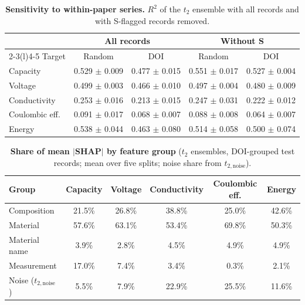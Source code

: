 \documentclass[3p]{elsarticle}
\begin{document}
\clearpage
\begin{table}[H]
    \centering\small
    \caption{\textbf{Sensitivity to within-paper series.} $R^2$ of the $t_2$ ensemble with all records and with S-flagged records removed.}
    \label{tab:series}
    \begin{tabular}{@{}lcccc@{}}
        \toprule
        & \multicolumn{2}{c}{All records} & \multicolumn{2}{c}{Without S} \\
        \cmidrule(lr){2-3}\cmidrule(l){4-5}
        Target & Random & DOI & Random & DOI \\
        \midrule
        Capacity       & 0.529 $\pm$ 0.009 & 0.477 $\pm$ 0.015 & 0.551 $\pm$ 0.017 & 0.527 $\pm$ 0.004 \\
        Voltage        & 0.499 $\pm$ 0.003 & 0.466 $\pm$ 0.010 & 0.497 $\pm$ 0.004 & 0.480 $\pm$ 0.009 \\
        Conductivity   & 0.253 $\pm$ 0.016 & 0.213 $\pm$ 0.015 & 0.247 $\pm$ 0.031 & 0.222 $\pm$ 0.012 \\
        Coulombic eff. & 0.091 $\pm$ 0.017 & 0.068 $\pm$ 0.007 & 0.088 $\pm$ 0.008 & 0.064 $\pm$ 0.007 \\
        Energy         & 0.538 $\pm$ 0.044 & 0.463 $\pm$ 0.080 & 0.514 $\pm$ 0.058 & 0.500 $\pm$ 0.074 \\
        \bottomrule
    \end{tabular}
\end{table}

\clearpage
\begin{table}[H]
    \centering\small
    \caption{\textbf{Share of mean $|$SHAP$|$ by feature group} ($t_2$ ensembles, DOI-grouped test records; mean over five splits; noise share from $t_{2,\mathrm{noise}}$).}
    \label{tab:shap}
    \begin{tabular}{@{}lccccc@{}}
        \toprule
        Group & Capacity & Voltage & Conductivity & Coulombic eff. & Energy \\
        \midrule
        Composition    & 21.5\% & 26.8\% & 38.8\% & 25.0\% & 42.6\% \\
        Material       & 57.6\% & 63.1\% & 53.4\% & 69.8\% & 50.3\% \\
        Material name  & 3.9\% & 2.8\% & 4.5\% & 4.9\% & 4.9\% \\
        Measurement    & 17.0\% & 7.4\% & 3.4\% & 0.3\% & 2.1\% \\
        \midrule
        Noise ($t_{2,\mathrm{noise}}$) & 5.5\% & 7.9\% & 22.9\% & 25.5\% & 11.6\% \\
        \bottomrule
    \end{tabular}
\end{table}
\end{document}
